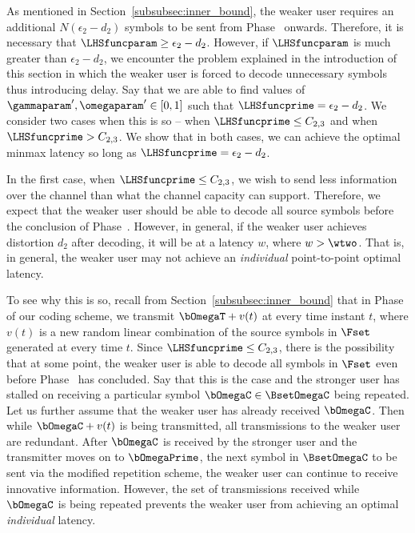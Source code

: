 As mentioned in Section~\ref{subsubsec:inner_bound}, the weaker user requires an additional $N(\epsilon_2 - d_2)$ symbols to be sent from Phase~ onwards.  Therefore, it is necessary that $\LHSfuncparam \geq \epsilon_2 - d_2$.  However, if $\LHSfuncparam$ is much greater than $\epsilon_2 - d_2$, we encounter the problem explained in the introduction of this section in which the weaker user is forced to decode unnecessary symbols thus introducing delay.  Say that we are able to find values of $\gammaparam', \omegaparam' \in [0, 1]$ such that $\LHSfuncprime = \epsilon_2 - d_2$.  We consider two cases when this is so -- when $\LHSfuncprime \leq C_{2, 3}$ and when $\LHSfuncprime > C_{2, 3}$.  We show that in both cases, we can achieve the optimal minmax  latency so long as $\LHSfuncprime = \epsilon_2 - d_2$.

In the first case, when $\LHSfuncprime \leq C_{2, 3}$, we wish to send less information over the channel than what the channel capacity can support.  Therefore, we expect that the weaker user should be able to decode all source symbols before the conclusion of Phase~.  However, in general, if the weaker user achieves distortion $d_2$ after decoding, it will be at a latency $w$, where $w > \wtwo$.  That is, in general, the weaker user may not achieve an \emph{individual} point-to-point optimal latency.

To see why this is so, recall from Section~\ref{subsubsec:inner_bound} that in Phase~ of our coding scheme, we transmit $\bOmegaT + v(t)$ at every time instant $t$, where $v(t)$ is a new random linear combination of the source symbols in $\Fset$ generated at every time $t$.  Since $\LHSfuncprime \leq C_{2, 3}$, there is the possibility that at some point, the weaker user is able to decode all symbols in $\Fset$ even before Phase~ has concluded.  Say that this is the case and the stronger user has stalled on receiving a particular symbol $\bOmegaC \in \BsetOmegaC$ being repeated.  Let us further assume that the weaker user has already received $\bOmegaC$.  Then while $\bOmegaC + v(t)$ is being transmitted, all transmissions to the weaker user are redundant.
After $\bOmegaC$ is received by the stronger user and the transmitter moves on to  $\bOmegaPrime$, the next symbol in $\BsetOmegaC$ to be sent via the modified repetition scheme, the weaker user can continue to receive innovative information.  However, the set of transmissions received while $\bOmegaC$ is being repeated prevents the weaker user from achieving an optimal \emph{individual} latency.

